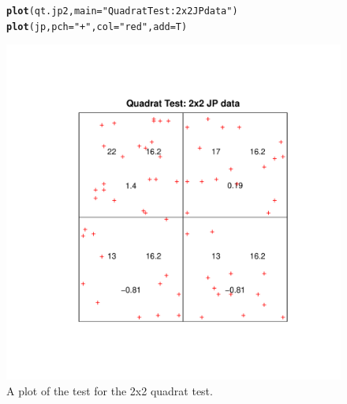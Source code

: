 \documentclass{article}\usepackage[]{graphicx}\usepackage[]{color}
\makeatletter
\def\maxwidth{ %
  \ifdim\Gin@nat@width>\linewidth
    \linewidth
  \else
    \Gin@nat@width
  \fi
}
\newcommand{\hlstr}[1]{\textcolor[rgb]{0.192,0.494,0.8}{#1}}%
\newcommand{\hlstd}[1]{\textcolor[rgb]{0.345,0.345,0.345}{#1}}%
\newcommand{\hlkwc}[1]{\textcolor[rgb]{0.333,0.667,0.333}{#1}}%
\newcommand{\hlkwd}[1]{\textcolor[rgb]{0.737,0.353,0.396}{\textbf{#1}}}%
\newenvironment{kframe}{%
 \def\at@end@of@kframe{}%
 \ifinner\ifhmode%
  \def\at@end@of@kframe{\end{minipage}}%
  \begin{minipage}{\columnwidth}%
 \fi\fi%
 \def\FrameCommand##1{\hskip\@totalleftmargin \hskip-\fboxsep
 \colorbox{shadecolor}{##1}\hskip-\fboxsep
     \hskip-\linewidth \hskip-\@totalleftmargin \hskip\columnwidth}%
 \MakeFramed {\advance\hsize-\width
   \@totalleftmargin\z@ \linewidth\hsize
   \@setminipage}}%
 {\par\unskip\endMakeFramed%
 \at@end@of@kframe}
\newenvironment{knitrout}{}{} %
\makeatother
\begin{document}
\begin{figure}
\begin{knitrout}
\color{fgcolor}\begin{kframe}
\begin{alltt}
\hlkwd{plot}\hlstd{(qt.jp2,} \hlkwc{main}\hlstd{=}\hlstr{"Quadrat Test: 2x2 JP data"}\hlstd{)}
\hlkwd{plot}\hlstd{(jp,} \hlkwc{pch}\hlstd{=}\hlstr{"+"}\hlstd{,} \hlkwc{col}\hlstd{=}\hlstr{"red"}\hlstd{,} \hlkwc{add}\hlstd{=T)}
\end{alltt}
\end{kframe}
\includegraphics[width=\maxwidth]{figure/plottests2x2} 

\end{knitrout}
\caption{A plot of the test for the 2x2 quadrat test.}
\label{qt.jp2}
\end{figure}
\end{document}
